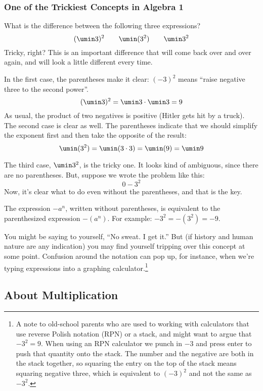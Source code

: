 \subsubsection*{One of the Trickiest Concepts in Algebra 1}

What is the difference between the following three expressions? \[(\umin3)^2 \qquad \umin(3^2) \qquad \umin3^2\]
Tricky, right? This is an important difference that will come back over and over again, and will look a little different every time.

In the first case, the parentheses make it clear: $(-3)^2$ means ``raise negative three to the second power''.\[(\umin3)^2 = \umin3 \cdot \umin3 = 9\]As usual, the product of two negatives is positive (Hitler gets hit by a truck). The second case is clear as well. The parentheses indicate that we should simplify the exponent first and then take the opposite of the result: \[\umin(3^2) = \umin(3\cdot3) = \umin(9) = \umin9\]

The third case, $\umin3^2$,  is the tricky one. It looks kind of ambiguous, since there are no parentheses. But, suppose we wrote the problem like this:
\[0 - 3^2\] Now, it's clear what to do even without the parentheses, and that is the key.

\begin{boxeddef}
The expression $-a^n$, written without parentheses, is equivalent to the parenthesized expression $-(a^n)$. For example: $-3^2 = -(3^2) = -9$.
\end{boxeddef}

You might be saying to yourself, ``No sweat. I get it.'' But (if history and human nature are any indication) you may find yourself tripping over this concept at some point. Confusion around the notation can pop up, for instance, when we're typing expressions into a graphing calculator.\footnote{A note to old-school parents who are used to working with calculators that use reverse Polish notation (RPN) or a stack, and might want to argue that $-3^2 = 9$. When using an RPN calculator we punch in $-3$ and press enter to push that quantity onto the stack. The number and the negative are both in the stack together, so squaring the entry on the top of the stack means squaring negative three, which is equivalent to $(-3)^2$ and not the same as $-3^2$.}

\subsection{About Multiplication}

